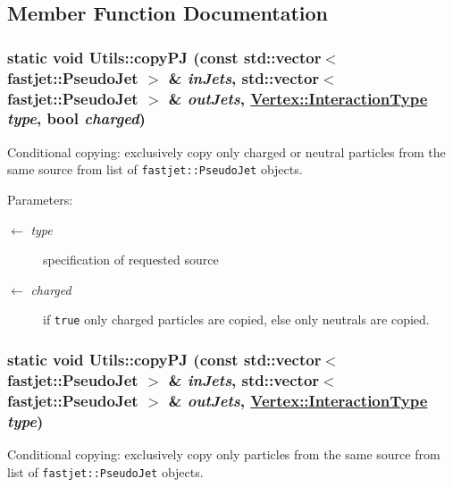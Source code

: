 \subsection{Member Function Documentation}
\hypertarget{structUtils_090c488d949a88d96e366d4cb78c10d9}{
\subsubsection[copyPJ]{\setlength{\rightskip}{0pt plus 5cm}static void Utils::copy\-PJ (const std::vector$<$ fastjet::Pseudo\-Jet $>$ \& {\em in\-Jets}, std::vector$<$ fastjet::Pseudo\-Jet $>$ \& {\em out\-Jets}, \hyperlink{classVertex_0d80a5c5ed3bd9be72a325aa448eca25}{Vertex::Interaction\-Type} {\em type}, bool {\em charged})}}
\label{structUtils_090c488d949a88d96e366d4cb78c10d9}


Conditional copying: exclusively copy only charged or neutral particles from the same source from list of {\tt fastjet::Pseudo\-Jet} objects. 

\begin{Desc}
\item[Parameters:]
\begin{description}
\item[\mbox{$\leftarrow$} {\em type}]specification of requested source \item[\mbox{$\leftarrow$} {\em charged}]if {\tt true} only charged particles are copied, else only neutrals are copied. \end{description}
\end{Desc}
\hypertarget{structUtils_c14816a57d84011c08359d8afe04df99}{
\subsubsection[copyPJ]{\setlength{\rightskip}{0pt plus 5cm}static void Utils::copy\-PJ (const std::vector$<$ fastjet::Pseudo\-Jet $>$ \& {\em in\-Jets}, std::vector$<$ fastjet::Pseudo\-Jet $>$ \& {\em out\-Jets}, \hyperlink{classVertex_0d80a5c5ed3bd9be72a325aa448eca25}{Vertex::Interaction\-Type} {\em type})}}
\label{structUtils_c14816a57d84011c08359d8afe04df99}


Conditional copying: exclusively copy only particles from the same source from list of {\tt fastjet::Pseudo\-Jet} objects. 

